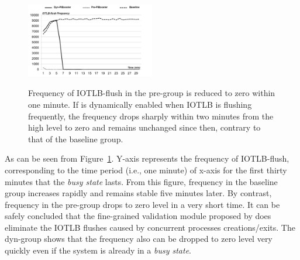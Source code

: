 \begin{figure}[ht]
\centering
\includegraphics[width=0.5\textwidth]{image/micro/iotlbflush.png} \\
\caption{Frequency of IOTLB-flush in the pre-\name group is reduced to zero within one minute. If \name is dynamically enabled when IOTLB is flushing frequently, the frequency drops sharply within two minutes from the high level to zero and remains unchanged since then, contrary to that of the baseline group.}
\label{fig:iotlbflush}
\end{figure}

As can be seen from Figure~\ref{fig:iotlbflush}. Y-axis represents the frequency of IOTLB-flush, corresponding to the time period (i.e., one minute) of x-axis for the first thirty minutes that the \emph{busy state} lasts. From this figure, frequency in the baseline group increases rapidly and remains stable five minutes later. By contrast, frequency in the pre-\name group drops to zero level in a very short time. It can be safely concluded that the fine-grained validation module proposed by \name does eliminate the IOTLB flushes caused by concurrent processes creations/exits. The dyn-\name group shows that the frequency also can be dropped to zero level very quickly even if the system is already in a \emph{busy state}.

